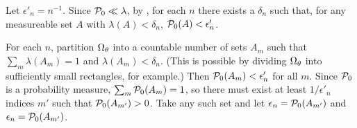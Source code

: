\begin{lem}
%
Let $\epsilon'_n = n^{-1}$.  Since $\mathcal{P}_{0} \ll \lambda$, by \citet[Proposition
15.5]{nielsen:1997:measure}, for each $n$ there exists a $\delta_n$ such that,
for any measureable set $A$ with $\lambda(A) < \delta_n$, $\mathcal{P}_{0}(A) <
\epsilon'_n$.

For each $n$, partition $\Omega_{\theta}$ into a countable number of sets $A_{m}$ such
that $\sum_{m} \lambda(A_{m}) = 1$ and $\lambda(A_{m}) < \delta_n$. (This is
possible by dividing $\Omega_{\theta}$ into sufficiently small rectangles, for
example.)  Then $\mathcal{P}_{0}(A_{m}) < \epsilon'_n$ for all $m$.  Since $\mathcal{P}_{0}$ is a
probability measure, $\sum_m \mathcal{P}_{0}(A_{m}) = 1$, so there must exist at least $1 /
\epsilon'_n$ indices $m'$ such that $\mathcal{P}_{0}(A_{m'}) > 0$. Take any such set and
let $\epsilon_n = \mathcal{P}_{0}(A_{m'})$ and $\epsilon_n = \mathcal{P}_{0}(A_{m'})$.

%
\end{lem}

